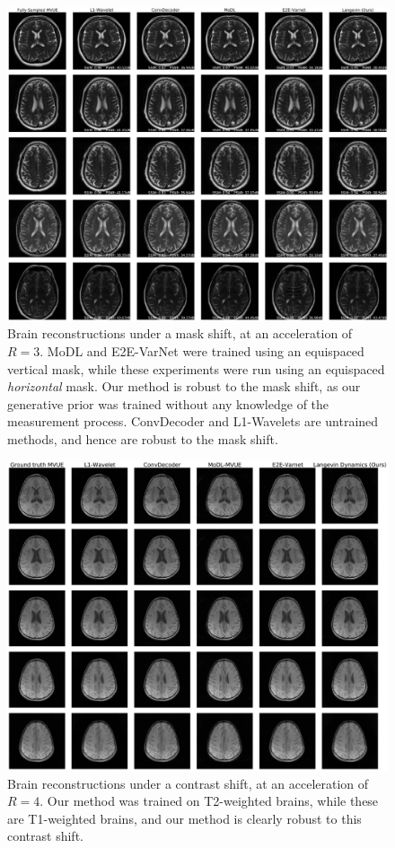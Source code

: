 \documentclass{article}
\begin{document}
\begin{figure}
    \centering
    \includegraphics[width=\columnwidth]{brain-equispaced-horizontal-R=3-comp.pdf}
    \caption{Brain reconstructions under a mask shift, at an acceleration of $R=3$. MoDL and E2E-VarNet were trained using an equispaced vertical mask, while these experiments were run using an equispaced \emph{horizontal} mask. Our method is robust to the mask shift, as our generative prior was trained without any knowledge of the measurement process. ConvDecoder and L1-Wavelets are untrained methods, and hence are robust to the mask shift.}
    \label{fig:brain-mask-shift-3}
\end{figure}


\begin{figure}
    \centering
    \includegraphics[width=\columnwidth]{brains-t1-equispaced-vertical-4-flipped-mvue-comp.pdf}
    \caption{Brain reconstructions under a contrast shift, at an acceleration of $R=4$. Our method was trained on T2-weighted brains, while these are T1-weighted brains, and our method is clearly robust to this contrast shift.}
    \label{fig:brain-t1-4}
\end{figure}
\end{document}
